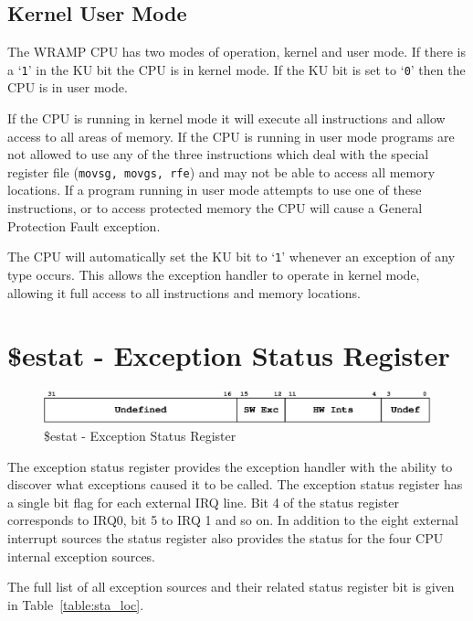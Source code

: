 \documentclass[a4paper,10pt]{article}
\begin{document}
\subsection{Kernel User Mode}

The WRAMP CPU has two modes of operation, kernel and user mode. If
there is a `\texttt{1}' in the KU bit the CPU is in kernel mode. If
the KU bit is set to `\texttt{0}' then the CPU is in user mode. 

If the CPU is running in kernel mode it will execute all instructions and
allow access to all areas of memory. If the CPU is running in user
mode programs are not allowed to use any of the three instructions
which deal with the special register file (\texttt{movsg, movgs, rfe})
and may not be able to access all memory locations. If a program
running in user mode attempts to use one of these instructions, or to
access protected memory the CPU will cause a General Protection Fault
exception.

The CPU will automatically set the KU bit to `\texttt{1}' whenever an
exception of any type occurs. This allows the exception handler to
operate in kernel mode, allowing it full access to all instructions
and memory locations.


\newpage
\section{\$estat - Exception Status Register}
\label{appen:estat}

\begin{figure}[h]
\begin{center}
\includegraphics[width=\textwidth]{estat.eps}
\caption{\$estat - Exception Status Register}
\label{estat_pic}
\end{center}
\end{figure}

The exception status register provides the exception handler with the
ability to discover what exceptions caused it to be called. The
exception status register has a single bit flag for each external IRQ
line. Bit 4 of the status register corresponds to IRQ0, bit 5 to IRQ 1
and so on. In addition to the eight external interrupt sources the
status register also provides the status for the four CPU internal
exception sources.

The full list of all exception sources and their related status
register bit is given in Table~\ref{table:sta_loc}.
\end{document}
